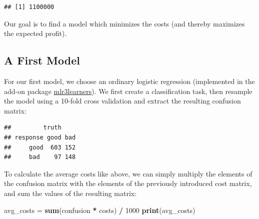 \documentclass[]{scrbook}
\newenvironment{Shaded}{\begin{snugshade}}{\end{snugshade}}
\newcommand{\DecValTok}[1]{\textcolor[rgb]{0.00,0.00,0.81}{#1}}
\newcommand{\KeywordTok}[1]{\textcolor[rgb]{0.13,0.29,0.53}{\textbf{#1}}}
\newcommand{\NormalTok}[1]{#1}
\newcommand{\OperatorTok}[1]{\textcolor[rgb]{0.81,0.36,0.00}{\textbf{#1}}}
\newcommand{\StringTok}[1]{\textcolor[rgb]{0.31,0.60,0.02}{#1}}
\renewenvironment{Shaded} {\begin{snugshade}\small} {\end{snugshade}}
\begin{document}
\begin{verbatim}
## [1] 1100000
\end{verbatim}

Our goal is to find a model which minimizes the costs (and thereby maximizes the expected profit).

\hypertarget{a-first-model}{%
\subsection{A First Model}\label{a-first-model}}

For our first model, we choose an ordinary logistic regression (implemented in the add-on package \href{https://mlr3learners.mlr-org.com}{mlr3learners}).
We first create a classification task, then resample the model using a 10-fold cross validation and extract the resulting confusion matrix:

\begin{Shaded}
\end{Shaded}

\begin{verbatim}
##         truth
## response good bad
##     good  603 152
##     bad    97 148
\end{verbatim}

To calculate the average costs like above, we can simply multiply the elements of the confusion matrix with the elements of the previously introduced cost matrix, and sum the values of the resulting matrix:

\begin{Shaded}
\begin{Highlighting}[]
\NormalTok{avg_costs =}\StringTok{ }\KeywordTok{sum}\NormalTok{(confusion }\OperatorTok{*}\StringTok{ }\NormalTok{costs) }\OperatorTok{/}\StringTok{ }\DecValTok{1000}
\KeywordTok{print}\NormalTok{(avg_costs)}
\end{Highlighting}
\end{Shaded}
\end{document}
